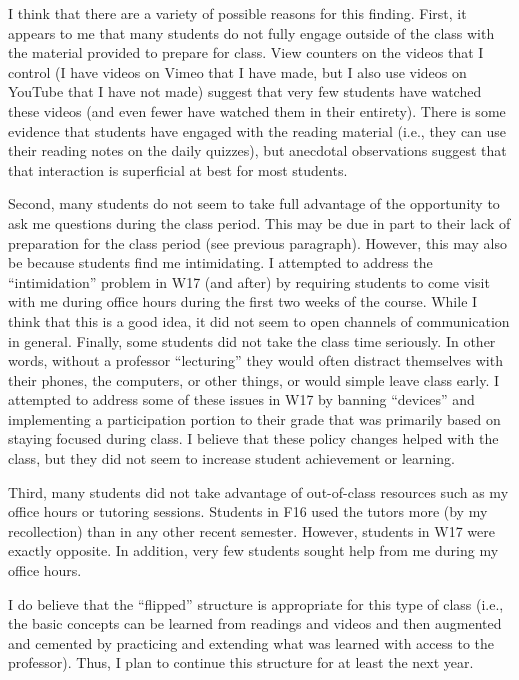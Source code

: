\documentclass{article}\usepackage[]{graphicx}\usepackage[]{color}
\begin{document}
I think that there are a variety of possible reasons for this finding. First, it appears to me that many students do not fully engage outside of the class with the material provided to prepare for class. View counters on the videos that I control (I have videos on Vimeo that I have made, but I also use videos on YouTube that I have not made) suggest that very few students have watched these videos (and even fewer have watched them in their entirety). There is some evidence that students have engaged with the reading material (i.e., they can use their reading notes on the daily quizzes), but anecdotal observations suggest that that interaction is superficial at best for most students.

Second, many students do not seem to take full advantage of the opportunity to ask me questions during the class period. This may be due in part to their lack of preparation for the class period (see previous paragraph). However, this may also be because students find me intimidating. I attempted to address the ``intimidation'' problem in W17 (and after) by requiring students to come visit with me during office hours during the first two weeks of the course. While I think that this is a good idea, it did not seem to open channels of communication in general. Finally, some students did not take the class time seriously. In other words, without a professor ``lecturing'' they would often distract themselves with their phones, the computers, or other things, or would simple leave class early. I attempted to address some of these issues in W17 by banning ``devices'' and implementing a participation portion to their grade that was primarily based on staying focused during class. I believe that these policy changes helped with the class, but they did not seem to increase student achievement or learning.

Third, many students did not take advantage of out-of-class resources such as my office hours or tutoring sessions. Students in F16 used the tutors more (by my recollection) than in any other recent semester. However, students in W17 were exactly opposite. In addition, very few students sought help from me during my office hours.

I do believe that the ``flipped'' structure is appropriate for this type of class (i.e., the basic concepts can be learned from readings and videos and then augmented and cemented by practicing and extending what was learned with access to the professor). Thus, I plan to continue this structure for at least the next year.
\end{document}
